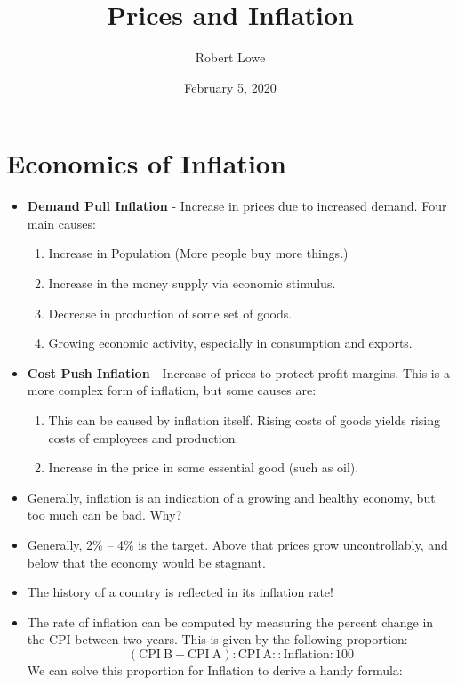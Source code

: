 \documentclass{article}
\title{Prices and Inflation}
\author{Robert Lowe}
\date{February 5, 2020}
\begin{document}
\maketitle
\setlength{\jot}{12pt}

\section*{Economics of Inflation}
\begin{itemize}
\item {\bf Demand Pull Inflation} - Increase in prices due to increased demand. Four main causes:
    \begin{enumerate}
        \item Increase in Population (More people buy more things.)
        \item Increase in the money supply via economic stimulus.
        \item Decrease in production of some set of goods.
        \item Growing economic activity, especially in consumption and exports.
    \end{enumerate}
\item {\bf Cost Push Inflation} - Increase of prices to protect profit margins. This is a more complex form of inflation, but some causes are:
    \begin{enumerate}
        \item This can be caused by inflation itself.  Rising costs of goods yields rising costs of employees and production.
        \item Increase in the price in some essential good (such as oil).
    \end{enumerate}
    \item Generally, inflation is an indication of a growing and healthy economy, but too much can be bad.  Why?
    \item Generally, 2\% -- 4\% is the target.  Above that prices grow uncontrollably, and below that the economy would be stagnant.
    \item The history of a country is reflected in its inflation rate!
    \item The rate of inflation can be computed by measuring the percent change in the CPI between two years.  This is given by the following proportion:
    \[
    \mathrm{(CPI\ B-CPI\ A):CPI\ A :: Inflation : 100}
    \]
    We can solve this proportion for Inflation to derive a handy formula:
    

\end{itemize}
\end{document}
